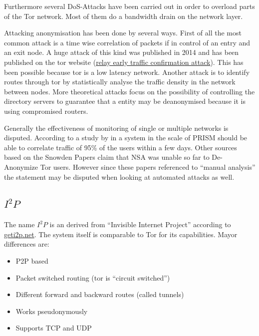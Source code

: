 Furthermore several DoS-Attacks have been carried out in order to overload parts of the Tor network. Most of them do a bandwidth drain on the network layer.

Attacking anonymisation has been done by several ways. First of all the most common attack is a time wise correlation of packets if in control of an entry and an exit node. A huge attack of this kind was published in 2014 and has been published on the tor website (\href{https://blog.torproject.org/blog/tor-security-advisory-relay-early-traffic-confirmation-attack}{relay early traffic confirmation attack}). This has been possible because tor is a low latency network. Another attack is to identify routes through tor by statistically analyse the traffic density in the network between nodes. More theoretical attacks focus on the possibility of controlling the directory servers to guarantee that a entity may be deanonymised because it is using compromised routers.

Generally the effectiveness of monitoring of single or multiple networks is disputed. According to a study by \citeauthor{ccs2013-usersrouted} in \citeyear{ccs2013-usersrouted}\cite{ccs2013-usersrouted} a system in the scale of PRISM should be able to correlate traffic of 95\% of the users within a few days. Other sources based on the Snowden Papers claim that NSA was unable so far to De-Anonymize Tor users. However since these papers referenced to ``manual analysis'' the  statement may be disputed when looking at automated attacks as well.




\subsection{$I^2P$}
The name $I^2P$ is an derived from  ``Invisible Internet Project'' according to \href{https://geti2p.net/}{geti2p.net}. The system itself is comparable to Tor for its capabilities. Mayor differences are:
\begin{itemize}
	\item P2P based
	\item Packet switched routing (tor is ``circuit switched'')
	\item Different forward and backward routes (called tunnels)
	\item Works pseudonymously
	\item Supports TCP and UDP
\end{itemize}

